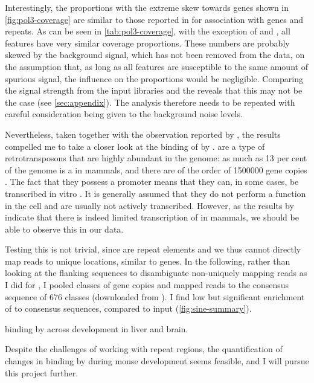 Interestingly, the proportions with the extreme skew towards \trna genes shown
in \cref{fig:pol3-coverage} are similar to those reported in
\citet{Raha:2010,Canella:2012} for  association with  genes and
repeats. As can be seen in \cref{tab:pol3-coverage}, with the exception of \rrna
and , all features have very similar coverage proportions. These
numbers are probably skewed by the  \chipseq background signal, which has
not been removed from the data, on the assumption that, as long as all features
are susceptible to the same amount of spurious signal, the influence on the
proportions would be negligible. Comparing the signal strength from the input
libraries and the  \chip reveals that this may not be the case (see
\cref{sec:appendix}). The analysis therefore needs to be repeated with careful
consideration being given to the background noise levels.

Nevertheless, taken together with the observation reported by
\citet{Carriere:2012}, the results compelled me to take a closer look at the
binding of \transsine by . \transsine are a type of retrotransposons that
are highly abundant in the genome: as much as \num{13} per cent of the genome is
a \transsine in mammals, and there are of the order of \num{1500000} gene copies
\citep{Lander:2001}. The fact that they possess a  promoter means that they
can, in some cases, be transcribed in vitro \citep{White:1998}. It is generally
assumed that they do not perform a function in the cell and are usually not
actively transcribed. However, as the results by \citet{Carriere:2012} indicate
that there is indeed limited transcription of \transsine in mammals, we should
be able to observe this in our  \chip data.

Testing this is not trivial, since \transsine[s] are repeat elements and we thus
cannot directly map reads to unique locations, similar to \trna genes. In the
following, rather than looking at the flanking sequences to disambiguate
non-uniquely mapping reads as I did for \trna, I pooled classes of \transsine
gene copies and mapped  \chipseq reads to the consensus sequence of
\num{676} classes (downloaded from  \citep{Jurka:2005}). I find
low but significant enrichment of  to \transsine consensus sequences,
compared to input (\cref{fig:sine-summary}).

{ binding by  across development in liver and brain.}{}

Despite the challenges of working with repeat regions, the quantification of
changes in \transsine binding by  during mouse development seems feasible,
and I will pursue this project further.
